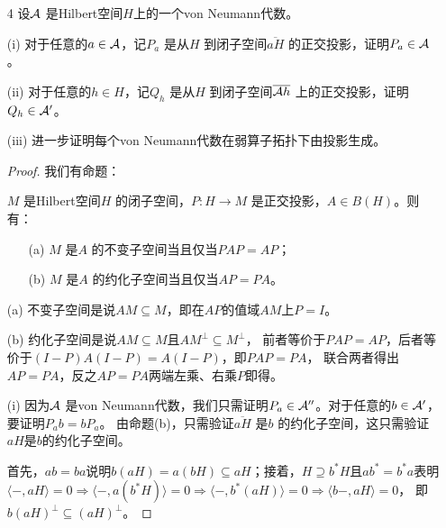 \begin{enumerate}
\begin{proof}
    我们再验证$ {A_{n}} $ 实际上强算子拓扑收敛到$ A $。

    对于任意的$ x\in H $，有
    \begin{align*}
        \| (A-A_{n})x \|_{2}^{2} &= \langle (A-A_{n})x, (A-A_{n})x \rangle \\
        &\leqslant \langle (A-A_{n})x, x \rangle ^{1/2} \langle (A-A_{n})(A-A_{n})x, (A-A_{n})x \rangle ^{1/2} \\
        &\leqslant \langle (A-A_{n})x, x \rangle ^{1/2} \| A-A_{n} \|^{3/2} \| x \|.
    \end{align*}
    其中$ \langle (A-A_{n})x, x \rangle $ 收敛于$ 0 $，而$\|A-A_{n}\|$ 有界，则整体收敛于$ 0 $，证完。
\end{proof}

\item[4] 设$ \mathcal{A} $ 是Hilbert空间$H$上的一个von Neumann代数。

(i) 对于任意的$ a\in\mathcal{A} $，记$ P_{a} $ 是从$ H $ 到闭子空间$ \overline{aH} $ 的正交投影，证明$ P_{a}\in\mathcal{A} $。

(ii) 对于任意的$ h\in H $，记$ Q_{h} $ 是从$ H $ 到闭子空间$ \overline{\mathcal{A} h} $ 上的正交投影，证明$ Q_{h}\in \mathcal{A}' $。

(iii) 进一步证明每个von Neumann代数在弱算子拓扑下由投影生成。

\begin{proof}
    我们有命题：
    
    $ M $ 是Hilbert空间$ H $ 的闭子空间，$ P: H\to M $ 是正交投影，$ A\in B(H) $。则有：
    \begin{itemize}
        \item[(a)] $ M $ 是$ A $ 的不变子空间当且仅当$ PAP=AP $；
        \item[(b)] $ M $ 是$ A $ 的约化子空间当且仅当$ AP=PA $。
    \end{itemize}
\begin{proofc}
    (a) 不变子空间是说$AM \subseteq M$，即在$AP$的值域$AM$上$P=I$。

    (b) 约化子空间是说$AM \subseteq M$且$AM^\perp \subseteq M^\perp$，
    前者等价于$PAP=AP$，后者等价于$(I-P)A(I-P)=A(I-P)$，即$PAP=PA$，
    联合两者得出$AP=PA$，反之$AP=PA$两端左乘、右乘$P$即得。
\end{proofc}
    
    (i) 因为$ \mathcal{A} $ 是von Neumann代数，我们只需证明$ P_{a}\in \mathcal{A}'' $。对于任意的$ b\in \mathcal{A}' $，要证明$ P_{a}b=bP_{a} $。
    由命题(b)，只需验证$ \overline{aH} $ 是$ b $ 的约化子空间，这只需验证$aH$是$b$的约化子空间。

    首先，$ab=ba$说明$b(aH)=a(bH) \subseteq aH$；接着，$H \supseteq b^*H$且$ab^*=b^*a$表明
    $\langle -,aH \rangle=0\Rightarrow\langle -,a(b^*H) \rangle=0\Rightarrow
    \langle -,b^*(aH) \rangle=0\Rightarrow\langle b-,aH \rangle=0$，
    即$b(aH)^\perp \subseteq (aH)^\perp$。


\end{proof}
\end{enumerate}
